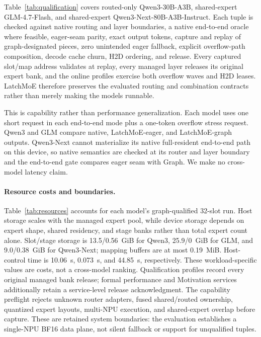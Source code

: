 Table~\ref{tab:qualification} covers routed-only Qwen3-30B-A3B, shared-expert
GLM-4.7-Flash, and shared-expert Qwen3-Next-80B-A3B-Instruct. Each tuple is
checked against native routing and layer boundaries, a native end-to-end oracle
where feasible, eager-seam parity, exact output tokens, capture and replay of
graph-designated pieces, zero unintended eager fallback, explicit overflow-path
composition, decode cache churn, H2D ordering, and release. Every captured
slot/map address validates at replay,
every managed layer releases its original expert bank, and the online profiles
exercise both overflow waves and H2D leases. LatchMoE therefore preserves the
evaluated routing and combination contracts rather than merely making the
models runnable.

This is capability rather than performance generalization. Each model uses one
short request in each end-to-end mode plus a one-token overflow stress request.
Qwen3 and GLM compare native, LatchMoE-eager, and LatchMoE-graph outputs.
Qwen3-Next cannot materialize its native full-resident end-to-end path on this
device, so native semantics are checked at its router and layer boundary and
the end-to-end gate compares eager seam with Graph. We make no cross-model
latency claim.

\paragraph{Resource costs and boundaries.}



Table~\ref{tab:resources} accounts for each model's graph-qualified 32-slot
run. Host storage scales with the managed expert pool, while device storage
depends on expert shape, shared residency, and stage banks rather than total
expert count alone. Slot/stage storage is 13.5/0.56~GiB for Qwen3,
25.9/0~GiB for GLM, and 9.0/0.38~GiB for Qwen3-Next; mapping buffers are at most
0.19~MiB. Host-control time is 10.06~s, 0.073~s, and 44.85~s, respectively.
These workload-specific values are costs, not a cross-model ranking.
Qualification profiles record every original managed bank
release; formal performance and Motivation services additionally retain a
service-level release acknowledgment. The capability preflight rejects
unknown router adapters, fused shared/routed ownership, quantized expert
layouts, multi-NPU execution, and shared-expert overlap before capture. These
are retained system boundaries: the evaluation establishes a single-NPU BF16
data plane, not silent fallback or support for unqualified tuples.
